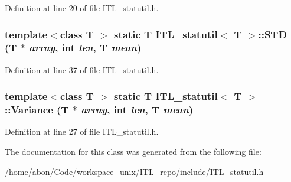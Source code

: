 Definition at line 20 of file ITL\_\-statutil.h.

\hypertarget{classITL__statutil_a1b511d9668163f4ebb8c6005b3d1a874}{
\subsubsection[{STD}]{\setlength{\rightskip}{0pt plus 5cm}template$<$class T $>$ static T {\bf ITL\_\-statutil}$<$ T $>$::STD (T $\ast$ {\em array}, \/  int {\em len}, \/  T {\em mean})}}
\label{classITL__statutil_a1b511d9668163f4ebb8c6005b3d1a874}


Definition at line 37 of file ITL\_\-statutil.h.

\hypertarget{classITL__statutil_a9fdf5ab88e10c73216e9ca17e8edc119}{
\subsubsection[{Variance}]{\setlength{\rightskip}{0pt plus 5cm}template$<$class T $>$ static T {\bf ITL\_\-statutil}$<$ T $>$::Variance (T $\ast$ {\em array}, \/  int {\em len}, \/  T {\em mean})}}
\label{classITL__statutil_a9fdf5ab88e10c73216e9ca17e8edc119}


Definition at line 27 of file ITL\_\-statutil.h.



The documentation for this class was generated from the following file:\begin{DoxyCompactItemize}
\item 
/home/abon/Code/workspace\_\-unix/ITL\_\-repo/include/\hyperlink{ITL__statutil_8h}{ITL\_\-statutil.h}\end{DoxyCompactItemize}
